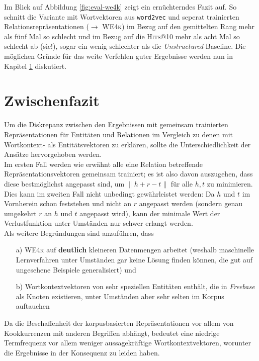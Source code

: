 Im Blick auf Abbildung \ref{fig:eval-we4k} zeigt ein ernüchterndes Fazit auf. So schnitt die Variante
mit Wortvektoren aus \verb|word2vec| und seperat trainierten Relationsrepräsentationen ($\rightarrow$ \textsc{WE4k}) im Bezug auf
den gemittelten Rang mehr als fünf Mal so schlecht und im Bezug auf die \textsc{Hits@10} mehr als acht Mal so schlecht ab (sic!),
sogar ein wenig schlechter als die \emph{Unstructured}-Baseline.
Die möglichen Gründe für das weite Verfehlen guter Ergebnisse werden nun in Kapitel \ref{sec:we4k-zwifa} diskutiert.

\section{Zwischenfazit}\label{sec:we4k-zwifa}

Um die Diskrepanz zwischen den Ergebnissen mit gemeinsam trainierten Repräsentationen für Entitäten und Relationen im Vergleich
zu denen mit Wortkontext- als Entitätsvektoren zu erklären, sollte die Unterschiedlichkeit der Ansätze hervorgehoben
werden.\\

Im ersten Fall werden wie erwähnt alle eine Relation betreffende Repräsentationsvektoren gemeinsam trainiert; es ist
also davon auszugehen, dass diese bestmöglichst angepasst sind, um $\parallel h + r - t\parallel$ für alle $h, t$ zu minimieren.\\
Dies kann im zweiten Fall nicht unbedingt gewährleistet werden: Da $h$ und $t$ im Vornherein schon feststehen und nicht
an $r$ angepasst werden (sondern genau umgekehrt $r$ an $h$ und $t$ angepasst wird), kann der minimale Wert der Verlustfunktion
unter Umständen nur schwer erlangt werden.\\
Als weitere Begründungen sind anzuführen, dass
\begin{itemize}
 \item[a)] \textsc{WE4k} auf \textbf{deutlich} kleineren Datenmengen arbeitet (weshalb maschinelle
  Lernverfahren unter Umständen gar keine Lösung finden können, die gut auf ungesehene Beispiele generalisiert) und
  \item[b)] Wortkontextvektoren von sehr speziellen Entitäten enthält, die in \emph{Freebase} als Knoten existieren,
  unter Umständen aber sehr selten im Korpus auftauchen
\end{itemize}
Da die Beschaffenheit der korpusbasierten Repräsentationen vor allem von Kookkurrenzen mit anderen
Begriffen abhängt, bedeutet eine niedrige Termfrequenz vor allem weniger aussagekräftige Wortkontextvektoren, worunter die
Ergebnisse in der Konsequenz zu leiden haben.\\

